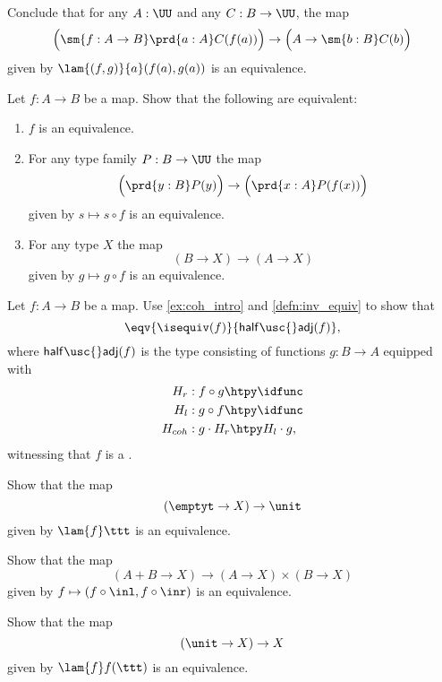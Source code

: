 \begin{exercises}
Conclude that for any $A:\UU$ and any $C:B\to \UU$, the map
\begin{equation*}
\Big(\sm{f:A\to B} \prd{a:A}C(f(a))\Big)\to\Big(A\to\sm{b:B}C(b)\Big)
\end{equation*}
given by $\lam{(f,g)}{a}(f(a),g(a))$ is an equivalence.
\item Let $f:A\to B$ be a map. Show that the following are equivalent:
\begin{enumerate}
\item $f$ is an equivalence.
\item For any type family $P:B\to\UU$ the map
\begin{equation*}
\Big(\prd{y:B}P(y)\Big)\to\Big(\prd{x:A}P(f(x))\Big)
\end{equation*}
given by $s\mapsto s\circ f$ is an equivalence.
\item For any type $X$ the map
\begin{equation*}
(B\to X)\to (A\to X)
\end{equation*}
given by $g\mapsto g\circ f$ is an equivalence. 
\end{enumerate}
\item Let $f:A\to B$ be a map. Use \autoref{ex:coh_intro} and \autoref{defn:inv_equiv} to show that
\begin{equation*}
\eqv{\isequiv(f)}{\mathsf{half\usc{}adj}(f)},
\end{equation*}
where $\mathsf{half\usc{}adj}(f)$ is the type consisting of functions $g:B\to A$ equipped with
\begin{align*}
H_r & : f\circ g\htpy \idfunc \\
H_l & : g\circ f\htpy \idfunc \\
H_{coh} & : g\cdot H_r\htpy H_l\cdot g,
\end{align*}
witnessing that $f$ is a .
\item Show that the map
\begin{equation*}
(\emptyt \to X)\to \unit
\end{equation*}
given by $\lam{f}\ttt$ is an equivalence.
\item Show that the map
\begin{equation*}
(A+B\to X)\to (A\to X)\times (B\to X)
\end{equation*}
given by $f\mapsto (f\circ\inl,f\circ\inr)$ is an equivalence.
\item Show that the map
\begin{equation*}
(\unit\to X)\to X
\end{equation*}
given by $\lam{f}f(\ttt)$ is an equivalence. 
\end{exercises}
